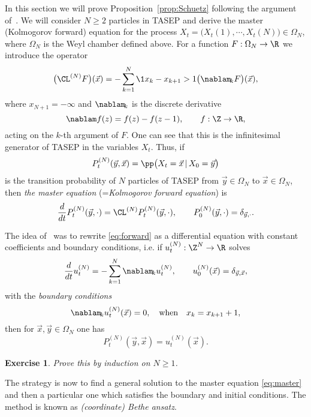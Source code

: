 \documentclass[]{pcmi}
\theoremstyle{plain}
\newtheorem{exercise}[equation]{Exercise}
\theoremstyle{definition}
\begin{document}
In this section we will prove Proposition~\ref{prop:Schuetz} following the argument of~\cite{MR2824604}. We will consider $N \geq 2$ particles in TASEP and derive the master (Kolmogorov forward) equation for the process $X_t  = \bigl(X_t(1), \cdots, X_t(N)\bigr) \in \Omega_N$, where $\Omega_N$ is the Weyl chamber defined above. For a function $F : \Omega_N \to \R$ we introduce the operator
\[
\big(\CL^{(N)} F\big)(\vec x) = -\sum_{k=1}^N \1{x_k - x_{k+1} > 1} \bigl(\nablam_{\!k} F\bigr)(\vec x),
\]
where $x_{N+1} = -\infty$ and $\nablam_{\!k}$ is the discrete derivative
\begin{equation}\label{eq:L}
 	\nablam f(z) = f(z) - f(z-1), \qquad f : \Z \to \R,
\end{equation}
acting on the $k$-th argument of $F$. One can see that this is the infinitesimal generator of TASEP in the variables $X_t$. Thus, if 
\[
	P^{(N)}_t(\vec y, \vec x) = \pp \bigl(X_t = \vec x\, |\, X_0 = \vec y\bigr) 
\]
is the transition probability of $N$ particles of TASEP from $\vec y \in \Omega_N$ to $\vec x \in \Omega_N$, then \emph{the master equation} (=\emph{Kolmogorov forward equation}) is
\begin{equation}\label{eq:forward}
	\frac{d}{dt} P^{(N)}_t(\vec y, \cdot) = \CL^{(N)} P^{(N)}_t(\vec y, \cdot), \qquad P^{(N)}_0(\vec y, \cdot) = \delta_{\vec y, \cdot}.
\end{equation}

The idea of~\cite{Bethe} was to rewrite \eqref{eq:forward} as a differential equation with constant coefficients and boundary conditions, i.e. if $u^{(N)}_t : \Z^N \to \R$ solves
\begin{equation}\label{eq:master}
	\frac{d}{dt} u^{(N)}_t = -\sum_{k=1}^N \nablam_{\!k} u^{(N)}_t, \qquad u^{(N)}_0(\vec x) = \delta_{\vec y, \vec x},
\end{equation}
with the \emph{boundary conditions}
\begin{equation}\label{eq:boundary}
	 \nablam_{\!k} u^{(N)}_t (\vec x) = 0, \quad \text{when} \quad x_{k} = x_{k+1} + 1,
\end{equation}
then for $\vec x, \vec y \in \Omega_N$ one has 
\begin{equation}\label{eq:P_u}
	P^{(N)}_t(\vec y, \vec x) = u^{(N)}_t(\vec x).
\end{equation}

\begin{exercise}
 Prove this  by induction on $N \geq 1$.
\end{exercise}

\noindent The strategy is now to find a general solution to the master equation \eqref{eq:master} and then  a particular one which satisfies the boundary and initial conditions.  The method is known as \emph{(coordinate) Bethe ansatz}.
\end{document}
